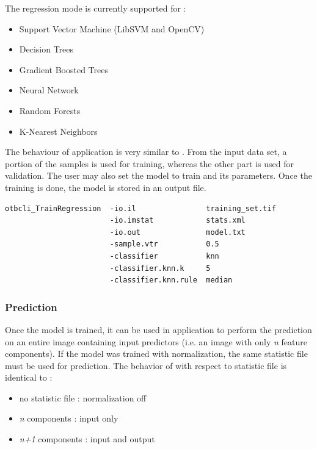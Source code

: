 The regression mode is currently supported for :
\begin{itemize}
\item Support Vector Machine (LibSVM and OpenCV)
\item Decision Trees
\item Gradient Boosted Trees
\item Neural Network
\item Random Forests
\item K-Nearest Neighbors
\end{itemize}

The behaviour of  application is very similar to
. From the input data set, a portion of the samples
is used for training, whereas the other part is used for validation. The user may
also set the model to train and its parameters. Once the training is done, the
model is stored in an output file.

\begin{verbatim}
otbcli_TrainRegression  -io.il                training_set.tif
                        -io.imstat            stats.xml
                        -io.out               model.txt
                        -sample.vtr           0.5
                        -classifier           knn
                        -classifier.knn.k     5
                        -classifier.knn.rule  median
\end{verbatim}


\subsubsection{Prediction}

Once the model is trained, it can be used in  application
to perform the prediction on an entire image containing input predictors (i.e.
an image with only \textit{n} feature components). If the model was trained with
normalization, the same statistic file must be used for prediction. The behavior
of  with respect to statistic file is identical to
 :
\begin{itemize}
\item no statistic file : normalization off
\item \textit{n} components :  input only
\item \textit{n+1} components : input and output
\end{itemize}

